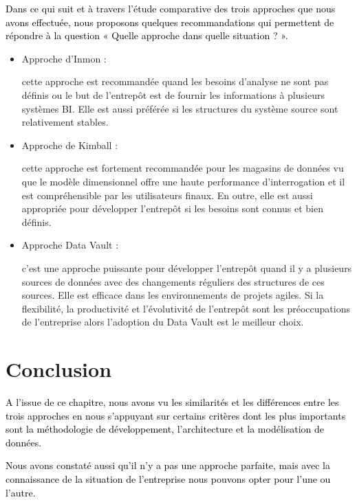 \documentclass[a4paper,12pt]{report}
\begin{document}
\textcolor{black}{Dans ce qui suit et à travers l’étude comparative des trois approches que nous avons effectuée, nous proposons quelques recommandations qui permettent de répondre à la question « Quelle approche dans quelle situation ? ».} 
\\
\begin{itemize}
	\item  \begin{bf}Approche d’Inmon : \end{bf}cette approche est recommandée quand les besoins d’analyse ne sont pas définis ou le but de l’entrepôt est de fournir les informations à plusieurs systèmes BI. Elle est aussi préférée si les structures du système source sont relativement stables.
	\item  \begin{bf}Approche de Kimball : \end{bf}cette approche est fortement recommandée pour les magasins de données vu que le modèle dimensionnel offre une haute performance d’interrogation et il est compréhensible par les utilisateurs finaux. En outre, elle est aussi appropriée pour développer l’entrepôt si les besoins sont connus et bien définis.
	\item  \begin{bf}Approche Data Vault : \end{bf}c’est une approche puissante pour développer l’entrepôt  quand il y a plusieurs sources de données avec des changements réguliers des structures de ces sources. Elle est efficace dans les environnements de projets agiles. Si la flexibilité, la productivité et l’évolutivité de l’entrepôt sont les préoccupations de l’entreprise alors l’adoption du Data Vault est le meilleur choix.
\end{itemize}


\section*{Conclusion}
\textcolor{black}{A l’issue de ce chapitre, nous avons vu les similarités et les différences entre les trois approches en nous s’appuyant sur certains critères dont les plus importants  sont la méthodologie de développement, l’architecture et la modélisation de données.}  

\textcolor{black}{Nous avons constaté aussi qu’il n’y a pas une approche parfaite, mais avec la connaissance de la situation de l’entreprise nous pouvons opter pour l’une ou l’autre.}\\
\end{document}
